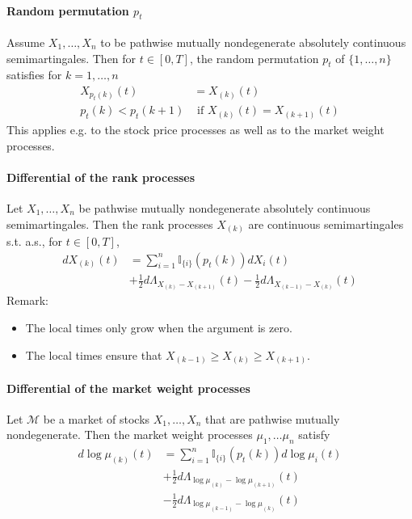 \documentclass[a4paper,landscape,8pt,fleqn]{scrartcl}
\begin{document}
\begin{multicols*}{3}
\paragraph{Random permutation $p_t$}

Assume $X_1, \ldots, X_n$ to be pathwise mutually nondegenerate absolutely continuous semimartingales.
Then for $t \in [0,T]$, the random permutation $p_t$ of $\lbrace 1, \ldots, n \rbrace$ satisfies for $k = 1, \ldots, n$
\begin{align*}
X_{p_t(k)}(t) &= X_{(k)}(t) \\
p_t(k) < p_t(k+1) &\text{ if } X_{(k)}(t) = X_{(k+1)}(t)
\end{align*}
This applies e.g. to the stock price processes as well as to the market weight processes.

\paragraph{Differential of the rank processes}

Let $X_1, \ldots, X_n$ be pathwise mutually nondegenerate absolutely continuous semimartingales. Then the rank processes $X_{(k)}$ are continuous semimartingales s.t. a.s., for $t \in [0,T]$,
\begin{align*}
dX_{(k)}(t) &= \sum_{i=1}^n \mathbb{I}_{\lbrace i \rbrace} (p_t(k)) dX_i(t) \\
&+ \frac{1}{2} d\Lambda_{X_{(k)} - X_{(k+1)}}(t) - \frac{1}{2} d\Lambda_{X_{(k-1)} - X_{(k)}}(t)
\end{align*}
Remark:
\begin{itemize}
\item The local times only grow when the argument is zero.
\item The local times ensure that $X_{(k-1)} \geq X_{(k)} \geq X_{(k+1)}$.
\end{itemize}

\paragraph{Differential of the market weight processes}

Let $\mathcal{M}$ be a market of stocks $X_1, \ldots, X_n$ that are pathwise mutually nondegenerate. Then the market weight processes $\mu_1, \ldots \mu_n$ satisfy
\begin{align*}
d\log \mu_{(k)}(t) &= \sum_{i=1}^n \mathbb{I}_{\lbrace i \rbrace}(p_t(k)) d\log \mu_i(t) \\
&+ \frac{1}{2} d\Lambda_{\log \mu_{(k)} - \log \mu_{(k+1)}}(t) \\
&- \frac{1}{2} d\Lambda_{\log \mu_{(k-1)} - \log \mu_{(k)}}(t)
\end{align*}


\end{multicols*}
\end{document}

